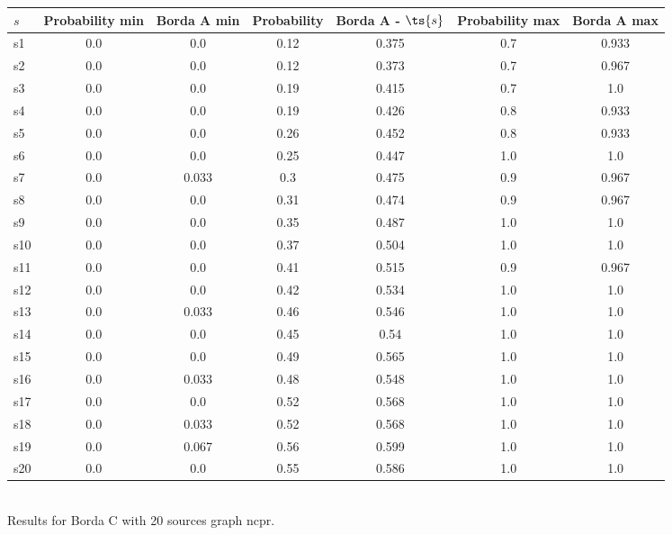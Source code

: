 \documentclass{article}
\begin{document}
\noindent\begin{tabular}{|l|c|c|c|c|c|c|}
\hline
$s$& Probability min & Borda A min & Probability & Borda A - $\ts{s}$ & Probability max & Borda A max\\
\hline
s1 &0.0 & 0.0 & 0.12 & 0.375 & 0.7 & 0.933\\
\hline
s2 &0.0 & 0.0 & 0.12 & 0.373 & 0.7 & 0.967\\
\hline
s3 &0.0 & 0.0 & 0.19 & 0.415 & 0.7 & 1.0\\
\hline
s4 &0.0 & 0.0 & 0.19 & 0.426 & 0.8 & 0.933\\
\hline
s5 &0.0 & 0.0 & 0.26 & 0.452 & 0.8 & 0.933\\
\hline
s6 &0.0 & 0.0 & 0.25 & 0.447 & 1.0 & 1.0\\
\hline
s7 &0.0 & 0.033 & 0.3 & 0.475 & 0.9 & 0.967\\
\hline
s8 &0.0 & 0.0 & 0.31 & 0.474 & 0.9 & 0.967\\
\hline
s9 &0.0 & 0.0 & 0.35 & 0.487 & 1.0 & 1.0\\
\hline
s10 &0.0 & 0.0 & 0.37 & 0.504 & 1.0 & 1.0\\
\hline
s11 &0.0 & 0.0 & 0.41 & 0.515 & 0.9 & 0.967\\
\hline
s12 &0.0 & 0.0 & 0.42 & 0.534 & 1.0 & 1.0\\
\hline
s13 &0.0 & 0.033 & 0.46 & 0.546 & 1.0 & 1.0\\
\hline
s14 &0.0 & 0.0 & 0.45 & 0.54 & 1.0 & 1.0\\
\hline
s15 &0.0 & 0.0 & 0.49 & 0.565 & 1.0 & 1.0\\
\hline
s16 &0.0 & 0.033 & 0.48 & 0.548 & 1.0 & 1.0\\
\hline
s17 &0.0 & 0.0 & 0.52 & 0.568 & 1.0 & 1.0\\
\hline
s18 &0.0 & 0.033 & 0.52 & 0.568 & 1.0 & 1.0\\
\hline
s19 &0.0 & 0.067 & 0.56 & 0.599 & 1.0 & 1.0\\
\hline
s20 &0.0 & 0.0 & 0.55 & 0.586 & 1.0 & 1.0\\
\hline
\end{tabular}\\

\noindent Results for Borda C with 20 sources graph ncpr.
\end{document}
